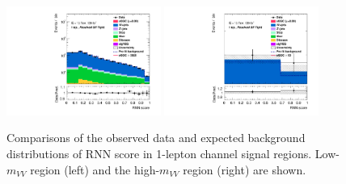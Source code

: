 \begin{figure}[]
    \includegraphics[width=0.45\textwidth]{figures/aQGC/PostFit/Region_distRNN_DSRVBSTightLMlvjj1500_BMin0_T0_Y6051_incTag1_J2_L1_incJet1_GlobalFit_unconditionnal_mu1log}
    \includegraphics[width=0.45\textwidth]{figures/aQGC/PostFit/Region_distRNN_DSRVBSTightHMlvjj1500_BMin0_T0_Y6051_incTag1_J2_L1_incJet1_GlobalFit_unconditionnal_mu1log}
      \caption{Comparisons of the observed data and expected background distributions of RNN score in 1-lepton channel signal regions. Low-$m_{VV}$ region (left) and the high-$m_{VV}$ region (right) are shown.}
      \label{fig:postSR1lepaQGC}
\end{figure}
